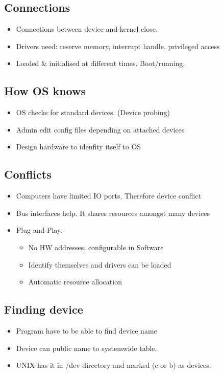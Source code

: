 \documentclass{article}
\begin{document}
	\subsection{Connections}
		\begin{itemize}
			\item Connections between device and kernel close.
			\item Drivers need: reserve memory, interrupt handle, privileged access
			\item Loaded \& initialised at different times. Boot/running.
		\end{itemize}
		
	\subsection{How OS knows}
		\begin{itemize}
			\item OS checks for standard devices. (Device probing)
			\item Admin edit config files depending on attached devices
			\item Design hardware to idenfity itself to OS
		\end{itemize}
		
	\subsection{Conflicts}
		\begin{itemize}
			\item Computers have limited IO ports. Therefore device conflict
			\item Bus interfaces help. It shares resources amongst many devices
			\item Plug and Play.
			\begin{itemize}
				\item No HW addresses, configurable in Software
				\item Identify themselves and drivers can be loaded
				\item Automatic resource allocation
			\end{itemize}
		\end{itemize}
		
	\subsection{Finding device}
		\begin{itemize}
			\item Program have to be able to find device name
			\item Device can public name to systemwide table.
			\item UNIX has it in /dev directory and marked (c or b) as devices.
		\end{itemize}
		
\end{document}
